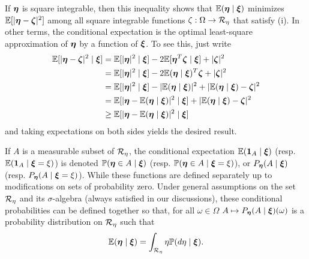 If ${\bm{\eta}}$ is square integrable, then this inequality shows that $\bm{\mathbb E}({\bm{\eta}}\mid {\bm{\xi}})$ minimizes $\bm{\mathbb E}[|{\bm{\eta}} - {\bm{\zeta}}|^2]$ among all square integrable functions $\zeta:\Omega\to {\mathcal R}_\eta$ that satisfy (i). In other terms, the conditional expectation is the optimal least-square approximation of ${\bm{\eta}}$ by a function of ${\bm{\xi}}$. To see this, just write
\begin{align*}
\bm{\mathbb E}[|{\bm{\eta}} - {\bm{\zeta}}|^2\mid {\bm{\xi}}] &= \bm{\mathbb E}[|{\bm{\eta}}|^2\mid {\bm{\xi}}]  - 2\bm{\mathbb E}[{\bm{\eta}}^T{\bm{\zeta}}\mid{\bm{\xi}}]
+ |{\bm{\zeta}}|^2\\
&= \bm{\mathbb E}[|{\bm{\eta}}|^2\mid{\bm{\xi}}]  - 2\bm{\mathbb E}({\bm{\eta}}\mid{\bm{\xi}})^T{\bm{\zeta}}
+|{\bm{\zeta}}|^2\\
&= \bm{\mathbb E}[|{\bm{\eta}}|^2\mid{\bm{\xi}}] - |\bm{\mathbb E}({\bm{\eta}}\mid{\bm{\xi}})|^2 +|\bm{\mathbb E}({\bm{\eta}}\mid{\bm{\xi}}) -{\bm{\zeta}}|^2\\
&= \bm{\mathbb E}[|{\bm{\eta}} - \bm{\mathbb E}({\bm{\eta}}\mid{\bm{\xi}})|^2\mid{\bm{\xi}}] +|\bm{\mathbb E}({\bm{\eta}}\mid{\bm{\xi}}) -{\bm{\zeta}}|^2\\
&\geq \bm{\mathbb E}[|{\bm{\eta}} - \bm{\mathbb E}({\bm{\eta}}\mid{\bm{\xi}})|^2\mid{\bm{\xi}}]
\end{align*}
and taking expectations on both sides yields the desired result.


If $A$ is a measurable subset of ${\mathcal R}_\eta$, the conditional expectation $\bm{\mathbb E}({\bm 1}_A\mid {\bm{\xi}})$ (resp. $\bm{\mathbb E}({\bm 1}_A\mid {\bm{\xi}} = \xi)$) is denoted  $\bm{\mathbb P}({\bm{\eta}} \in A\mid {\bm{\xi}})$ (resp. $\bm{\mathbb P}({\bm{\eta}}\in A\mid {\bm{\xi}} = \xi)$), or $P_{\bm{\eta}}(A\mid {\bm{\xi}})$ (resp. $P_{\bm{\eta}}(A\mid {\bm{\xi}} = \xi)$).
While these functions are defined separately up to modifications on sets of probability zero. Under general assumptions on the set ${\mathcal R}_\eta$ and its $\sigma$-algebra (always satisfied in our discussions), these conditional probabilities can be defined together so that, for all $\omega \in \Omega$  $A\mapsto P_{\bm{\eta}}(A \mid {\bm{\xi}})(\omega)$ is a probability distribution  on ${\mathcal R}_\eta$ such that
\[
\bm{\mathbb E}({\bm{\eta}}\mid {\bm{\xi}}) = \int_{{\mathcal R}_\eta} \eta \bm{\mathbb P}(d\eta\mid {\bm{\xi}}).
\] 

